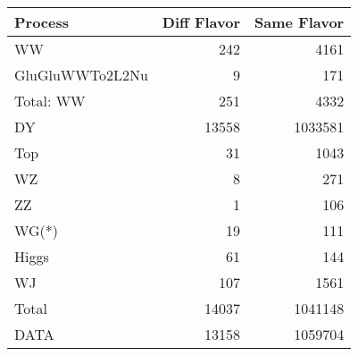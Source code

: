 \begin{table}[ht]
	\centering
\begin{tabular}{lrr}

         Process &  Diff Flavor &  Same Flavor \\
		\hline
              WW &          242 &         4161 \\
 GluGluWWTo2L2Nu &            9 &          171 \\
\hline
       Total: WW &          251 &         4332 \\
              DY &        13558 &      1033581 \\
             Top &           31 &         1043 \\
              WZ &            8 &          271 \\
              ZZ &            1 &          106 \\
           WG(*) &           19 &          111 \\
           Higgs &           61 &          144 \\
              WJ &          107 &         1561 \\
\hline
           Total &        14037 &      1041148 \\
            DATA &        13158 &      1059704 \\


\end{tabular}

\end{table}